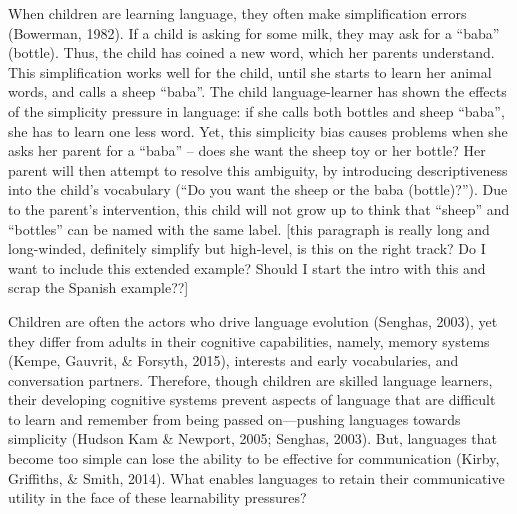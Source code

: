 \documentclass[10pt, letterpaper]{article}
\begin{document}
When children are learning language, they often make simplification
errors (Bowerman, 1982). If a child is asking for some milk, they may
ask for a ``baba'' (bottle). Thus, the child has coined a new word,
which her parents understand. This simplification works well for the
child, until she starts to learn her animal words, and calls a sheep
``baba''. The child language-learner has shown the effects of the
simplicity pressure in language: if she calls both bottles and sheep
``baba'', she has to learn one less word. Yet, this simplicity bias
causes problems when she asks her parent for a ``baba'' -- does she want
the sheep toy or her bottle? Her parent will then attempt to resolve
this ambiguity, by introducing descriptiveness into the child's
vocabulary (``Do you want the sheep or the baba (bottle)?''). Due to the
parent's intervention, this child will not grow up to think that
``sheep'' and ``bottles'' can be named with the same label. {[}this
paragraph is really long and long-winded, definitely simplify but
high-level, is this on the right track? Do I want to include this
extended example? Should I start the intro with this and scrap the
Spanish example??{]}

Children are often the actors who drive language evolution (Senghas,
2003), yet they differ from adults in their cognitive capabilities,
namely, memory systems (Kempe, Gauvrit, \& Forsyth, 2015), interests and
early vocabularies, and conversation partners. Therefore, though
children are skilled language learners, their developing cognitive
systems prevent aspects of language that are difficult to learn and
remember from being passed on---pushing languages towards simplicity
(Hudson Kam \& Newport, 2005; Senghas, 2003). But, languages that become
too simple can lose the ability to be effective for communication
(Kirby, Griffiths, \& Smith, 2014). What enables languages to retain
their communicative utility in the face of these learnability pressures?
\end{document}

